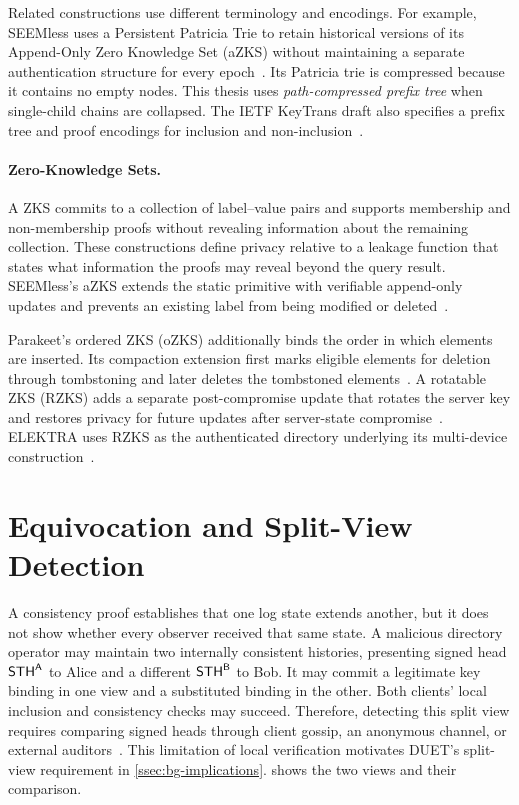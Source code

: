 Related constructions use different terminology and encodings. For example, SEEMless uses a
Persistent Patricia Trie to retain historical versions of its Append-Only Zero Knowledge Set
(aZKS) without maintaining a separate authentication structure for every
epoch~\cite[Section~6]{chase2019seemless}. Its Patricia trie is compressed because it contains no
empty nodes. This thesis uses \emph{path-compressed prefix tree} when single-child chains are
collapsed. The IETF KeyTrans draft also specifies a prefix tree and proof encodings for
inclusion and non-inclusion~\cite[Sections~3.3 and~12.2]{ietf-keytrans-protocol}.

\paragraph{Zero-Knowledge Sets.} A ZKS commits to a collection of label--value pairs and supports
membership and non-membership proofs without revealing information about the remaining collection.
These constructions define privacy relative to a leakage function that states what information the
proofs may reveal beyond the query result. SEEMless's aZKS extends the static primitive with
verifiable append-only updates and prevents an existing label from being modified or
deleted~\cite[Sections~2--3]{chase2019seemless}.

Parakeet's ordered ZKS (oZKS) additionally binds the order in which elements are inserted. Its
compaction extension first marks eligible elements for deletion through tombstoning and later
deletes the tombstoned elements~\cite[Sections~III-C and~IV]{malvai2023parakeet}. A rotatable ZKS
(RZKS) adds a separate post-compromise update that rotates the server key and restores privacy for
future updates after server-state compromise~\cite[Sections~1 and~3]{chen2022rzks}. ELEKTRA
uses RZKS as the authenticated directory underlying its multi-device
construction~\cite[Sections~1 and~3.1]{len2023elektra}.

\section{Equivocation and Split-View Detection}\label{sec:ext-splitview}

A consistency proof establishes that one log state extends another, but it does not show whether
every observer received that same state. A malicious directory operator may maintain two internally
consistent histories, presenting signed head $\mathsf{STH}^{\mathsf{A}}$ to Alice and a different $\mathsf{STH}^{\mathsf{B}}$ to Bob.
It may commit a legitimate key binding in one view and a substituted binding in the other. Both
clients' local inclusion and consistency checks may succeed. Therefore, detecting this split view
requires comparing signed heads through client gossip, an anonymous channel, or external
auditors~\cite{melara2015coniks,ietf-keytrans-protocol}. This limitation of local verification motivates
DUET's split-view requirement in \cref{ssec:bg-implications}.  shows the two
views and their comparison.

